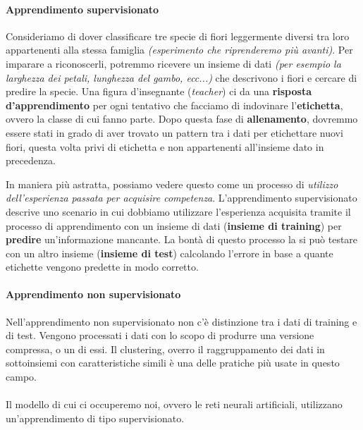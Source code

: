 \documentclass[12pt, twoside, letterpaper]{report}
\begin{document}
				\paragraph{Apprendimento supervisionato} Consideriamo di dover classificare tre specie di fiori leggermente diversi tra loro appartenenti alla stessa famiglia \textit{(esperimento che riprenderemo più avanti)}. Per imparare a riconoscerli, potremmo ricevere un insieme di dati \textit{(per esempio la larghezza dei petali, lunghezza del gambo, ecc...)} che descrivono i fiori e cercare di predire la specie. Una figura d'insegnante (\textit{teacher}) ci da una \textbf{risposta d'apprendimento} per ogni tentativo che facciamo di indovinare l'\textbf{etichetta}, ovvero la classe di cui fanno parte. Dopo questa fase di \textbf{allenamento}, dovremmo essere stati in grado di aver trovato un pattern tra i dati per etichettare nuovi fiori, questa volta privi di etichetta e non appartenenti all'insieme dato in precedenza. 
										
					In maniera più astratta, possiamo vedere questo come un processo di \textit{utilizzo dell'esperienza passata per acquisire competenza}. L'apprendimento supervisionato descrive uno scenario in cui dobbiamo utilizzare l'esperienza acquisita tramite il processo di apprendimento con un insieme di dati (\textbf{insieme di training}) per \textbf{predire} un'informazione mancante. La bontà di questo processo la si può testare con un altro insieme (\textbf{insieme di test}) calcolando l'errore in base a quante etichette vengono predette in modo corretto. 
				
				\paragraph{Apprendimento non supervisionato}  Nell'apprendimento non supervisionato non c'è distinzione tra i dati di training e di test. Vengono processati i dati con lo scopo di produrre una versione compressa, o un  di essi. Il clustering, overro il raggruppamento dei dati in sottoinsiemi con caratteristiche simili è una delle pratiche più usate in questo campo.\\\\
				Il modello di cui ci occuperemo noi, ovvero le reti neurali artificiali, utilizzano un'apprendimento di tipo supervisionato.
				
				
\end{document}
